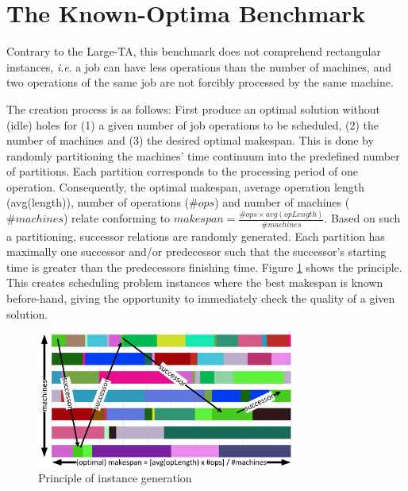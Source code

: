 \documentclass{article}
\newcommand{\ie}{\textit{i}.\textit{e}. }
\begin{document}


\section{The Known-Optima Benchmark} Contrary to the Large-TA, this benchmark does not comprehend rectangular instances, \ie a job can have less operations than the number of machines, and two operations of the same job are not forcibly processed by the same machine. 

The creation process is as follows: First produce an optimal solution without (idle) holes for (1) a given number of job operations to be scheduled, (2) the number of machines and (3) the desired optimal makespan. This is done by randomly partitioning the machines' time continuum into the predefined number of partitions. Each partition corresponds to the processing period of one operation. Consequently, the optimal makespan, average operation length (avg(length)), number of operations ($\#ops$) and number of machines ($\#machines$) relate conforming to $makespan = \frac{\#ops \times avg(opLength)}{\#machines}$. Based on such a partitioning, successor relations are randomly generated. Each partition has maximally one successor and/or predecessor such that the successor's starting time is greater than the predecessors finishing time. Figure \ref{instanceGeneration} shows the principle. This creates scheduling problem instances where the best makespan is known before-hand, giving the opportunity to immediately check the quality of a given solution.

\begin{figure}
\center
	\includegraphics[width=8.5cm]{instanceGeneration.png}
	\caption{Principle of instance generation}
	\label{instanceGeneration}
\end{figure}
\end{document}
